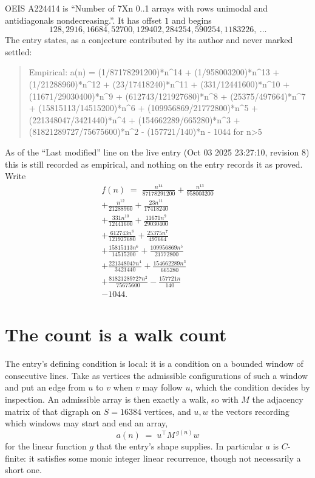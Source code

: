 \documentclass[11pt,a4paper]{article}
\theoremstyle{plain}
\theoremstyle{definition}
\begin{document}
OEIS A224414 is ``Number of 7Xn 0..1 arrays with rows unimodal and antidiagonals nondecreasing.''. It has offset $1$ and begins
\[
128, 2916, 16684, 52700, 129402, 284254, 590254, 1183226,\ \dots
\]
The entry states, as a conjecture contributed by its author and never marked settled:
\begin{quote}
Empirical: a(n) = (1/87178291200)*n\^{}14 + (1/958003200)*n\^{}13 + (1/21288960)*n\^{}12 + (23/17418240)*n\^{}11 + (331/12441600)*n\^{}10 + (11671/29030400)*n\^{}9 + (612743/121927680)*n\^{}8 + (25375/497664)*n\^{}7 + (15815113/14515200)*n\^{}6 + (109956869/21772800)*n\^{}5 + (221348047/3421440)*n\^{}4 + (154662289/665280)*n\^{}3 + (81821289727/75675600)*n\^{}2 - (157721/140)*n - 1044 for n>5
\end{quote}
As of the ``Last modified'' line on the live entry (Oct 03 2025 23:27:10, revision 8) this is still
recorded as empirical, and nothing on the entry records it as proved. Write
\begin{multline*}
f(n)\;=\;\frac{n^{14}}{87178291200} + \frac{n^{13}}{958003200} \\
+ \frac{n^{12}}{21288960} + \frac{23 n^{11}}{17418240} \\
+ \frac{331 n^{10}}{12441600} + \frac{11671 n^{9}}{29030400} \\
+ \frac{612743 n^{8}}{121927680} + \frac{25375 n^{7}}{497664} \\
+ \frac{15815113 n^{6}}{14515200} + \frac{109956869 n^{5}}{21772800} \\
+ \frac{221348047 n^{4}}{3421440} + \frac{154662289 n^{3}}{665280} \\
+ \frac{81821289727 n^{2}}{75675600} - \frac{157721 n}{140} \\
- 1044.
\end{multline*}

\section{The count is a walk count}

The entry's defining condition is local: it is a condition on a bounded window of consecutive lines. Take as vertices the
admissible configurations of such a window and put an edge from $u$ to $v$ when $v$ may
follow $u$, which the condition decides by inspection. An admissible array is then exactly a
walk, so with $M$ the adjacency matrix of that digraph on $S=16384$ vertices, and $u,w$ the
vectors recording which windows may start and end an array,
\[
a(n)\;=\;u^{\!\top}M^{\,g(n)}w
\]
for the linear function $g$ that the entry's shape supplies. In particular $a$ is
$C$-finite: it satisfies some monic integer linear recurrence, though not necessarily a short
one.
\end{document}
